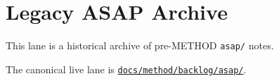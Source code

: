 \chapter{Legacy ASAP Archive}\label{record-387}

\smallskip

This lane is a historical archive of pre-METHOD \texttt{a\allowbreak{}s\allowbreak{}a\allowbreak{}p\allowbreak{}/} notes.

The canonical live lane is \href{https://github.com/flyingrobots/bijou/blob/cbd70612140e7a450d764b3c7be1c6af878b99bc/docs/method/graveyard/method/backlog/asap/README.md}{\texttt{d\allowbreak{}o\allowbreak{}c\allowbreak{}s\allowbreak{}/\allowbreak{}m\allowbreak{}e\allowbreak{}t\allowbreak{}h\allowbreak{}o\allowbreak{}d\allowbreak{}/\allowbreak{}b\allowbreak{}a\allowbreak{}c\allowbreak{}k\allowbreak{}l\allowbreak{}o\allowbreak{}g\allowbreak{}/\allowbreak{}a\allowbreak{}s\allowbreak{}a\allowbreak{}p\allowbreak{}/}}.

